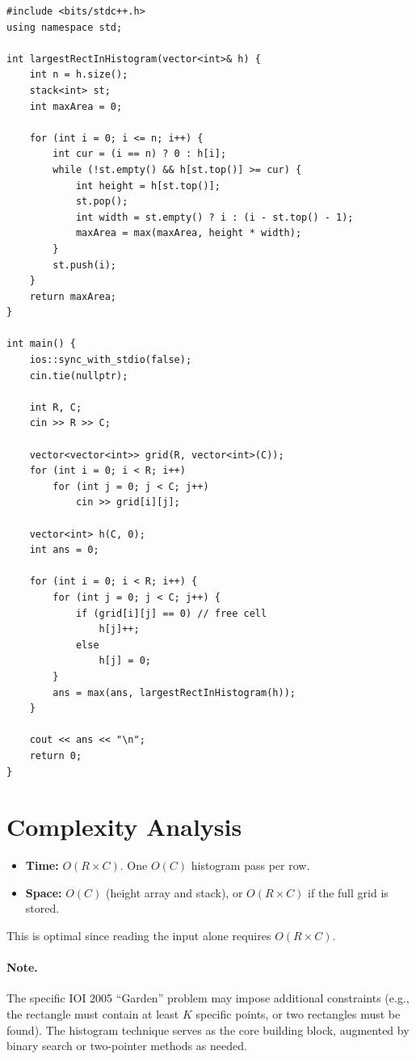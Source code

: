 \documentclass[11pt,a4paper]{article}
\begin{document}
\begin{lstlisting}
#include <bits/stdc++.h>
using namespace std;

int largestRectInHistogram(vector<int>& h) {
    int n = h.size();
    stack<int> st;
    int maxArea = 0;

    for (int i = 0; i <= n; i++) {
        int cur = (i == n) ? 0 : h[i];
        while (!st.empty() && h[st.top()] >= cur) {
            int height = h[st.top()];
            st.pop();
            int width = st.empty() ? i : (i - st.top() - 1);
            maxArea = max(maxArea, height * width);
        }
        st.push(i);
    }
    return maxArea;
}

int main() {
    ios::sync_with_stdio(false);
    cin.tie(nullptr);

    int R, C;
    cin >> R >> C;

    vector<vector<int>> grid(R, vector<int>(C));
    for (int i = 0; i < R; i++)
        for (int j = 0; j < C; j++)
            cin >> grid[i][j];

    vector<int> h(C, 0);
    int ans = 0;

    for (int i = 0; i < R; i++) {
        for (int j = 0; j < C; j++) {
            if (grid[i][j] == 0) // free cell
                h[j]++;
            else
                h[j] = 0;
        }
        ans = max(ans, largestRectInHistogram(h));
    }

    cout << ans << "\n";
    return 0;
}
\end{lstlisting}

\section{Complexity Analysis}
\begin{itemize}
  \item \textbf{Time:} $O(R \times C)$. One $O(C)$ histogram pass per
        row.
  \item \textbf{Space:} $O(C)$ (height array and stack), or $O(R \times C)$
        if the full grid is stored.
\end{itemize}

This is optimal since reading the input alone requires $O(R \times C)$.

\paragraph{Note.} The specific IOI 2005 ``Garden'' problem may impose
additional constraints (e.g., the rectangle must contain at least $K$
specific points, or two rectangles must be found). The histogram
technique serves as the core building block, augmented by binary search
or two-pointer methods as needed.
\end{document}
